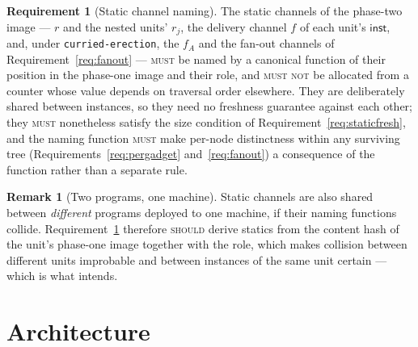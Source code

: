 \documentclass[11pt,a4paper]{article}
\newcommand{\code}[1]{\texttt{#1}}
\newcommand{\MUST}{\textsc{must}}
\newcommand{\MUSTNOT}{\textsc{must not}}
\newcommand{\SHOULD}{\textsc{should}}
\newcommand{\inst}{\mathsf{inst}}
\theoremstyle{definition}
\newtheorem{requirement}[definition]{Requirement}
\newtheorem{remark}[definition]{Remark}
\theoremstyle{plain}
\begin{document}
\begin{requirement}[Static channel naming]\label{req:statics}
The static channels of the phase-two image --- $r$ and the nested units'
$r_{j}$, the delivery channel $f$ of each unit's $\inst$, and, under
\code{curried-erection}, the $f_{A}$ and the fan-out channels of
Requirement~\ref{req:fanout} --- \MUST{} be named by a canonical function of
their position in the phase-one image and their role, and \MUSTNOT{} be
allocated from a counter whose value depends on traversal order elsewhere.
They are deliberately shared between instances, so they need no freshness
guarantee against each other; they \MUST{} nonetheless satisfy the size
condition of Requirement~\ref{req:staticfresh}, and the naming function
\MUST{} make per-node distinctness within any surviving tree
(Requirements~\ref{req:pergadget} and~\ref{req:fanout}) a consequence of the
function rather than a separate rule.
\end{requirement}

\begin{remark}[Two programs, one machine]
Static channels are also shared between \emph{different} programs deployed to
one machine, if their naming functions collide. Requirement~\ref{req:statics}
therefore \SHOULD{} derive statics from the content hash of the unit's
phase-one image together with the role, which makes collision between
different units improbable and between instances of the same unit certain ---
which is what \cite[Rem.~6.10]{draft3} intends.
\end{remark}

\section{Architecture}\label{sec:arch}
\end{document}
